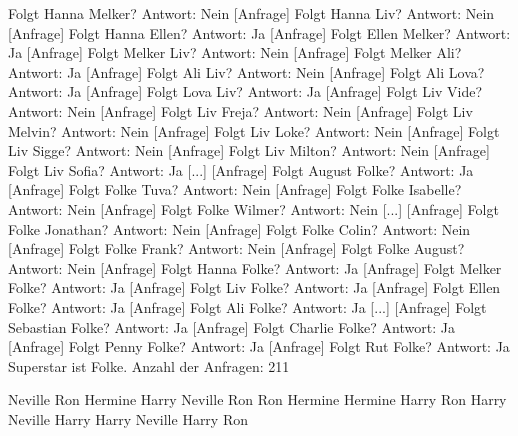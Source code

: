 \documentclass[a4paper, notitlepage, 12pt]{scrartcl}
\begin{document}
\begin{MyVerbatim}
[Anfrage] Folgt Hanna Melker? Antwort: Nein
[Anfrage] Folgt Hanna Liv? Antwort: Nein
[Anfrage] Folgt Hanna Ellen? Antwort: Ja
[Anfrage] Folgt Ellen Melker? Antwort: Ja
[Anfrage] Folgt Melker Liv? Antwort: Nein
[Anfrage] Folgt Melker Ali? Antwort: Ja
[Anfrage] Folgt Ali Liv? Antwort: Nein
[Anfrage] Folgt Ali Lova? Antwort: Ja
[Anfrage] Folgt Lova Liv? Antwort: Ja
[Anfrage] Folgt Liv Vide? Antwort: Nein
[Anfrage] Folgt Liv Freja? Antwort: Nein
[Anfrage] Folgt Liv Melvin? Antwort: Nein
[Anfrage] Folgt Liv Loke? Antwort: Nein
[Anfrage] Folgt Liv Sigge? Antwort: Nein
[Anfrage] Folgt Liv Milton? Antwort: Nein
[Anfrage] Folgt Liv Sofia? Antwort: Ja
[...]
[Anfrage] Folgt August Folke? Antwort: Ja
[Anfrage] Folgt Folke Tuva? Antwort: Nein
[Anfrage] Folgt Folke Isabelle? Antwort: Nein
[Anfrage] Folgt Folke Wilmer? Antwort: Nein
[...]
[Anfrage] Folgt Folke Jonathan? Antwort: Nein
[Anfrage] Folgt Folke Colin? Antwort: Nein
[Anfrage] Folgt Folke Frank? Antwort: Nein
[Anfrage] Folgt Folke August? Antwort: Nein
[Anfrage] Folgt Hanna Folke? Antwort: Ja
[Anfrage] Folgt Melker Folke? Antwort: Ja
[Anfrage] Folgt Liv Folke? Antwort: Ja
[Anfrage] Folgt Ellen Folke? Antwort: Ja
[Anfrage] Folgt Ali Folke? Antwort: Ja
[...]
[Anfrage] Folgt Sebastian Folke? Antwort: Ja
[Anfrage] Folgt Charlie Folke? Antwort: Ja
[Anfrage] Folgt Penny Folke? Antwort: Ja
[Anfrage] Folgt Rut Folke? Antwort: Ja
Superstar ist Folke.
Anzahl der Anfragen: 211
\end{MyVerbatim}


\begin{MyVerbatim}
Neville Ron Hermine Harry
Neville Ron
Ron Hermine
Hermine Harry
Ron Harry
Neville Harry
Harry Neville
Harry Ron
\end{MyVerbatim}

\end{document}
